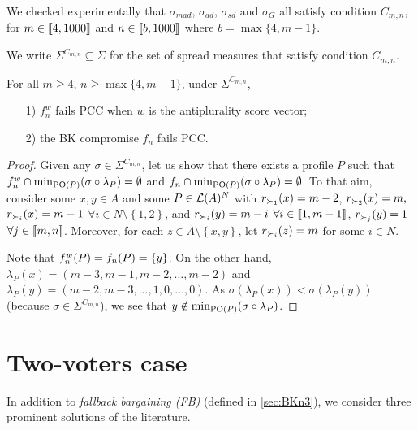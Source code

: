 \begin{remark}
	\label{prop:spreadMeas}
	We checked experimentally that $\sigma_{mad}$, $\sigma_{ad}$, $\sigma_{sd}$ and $\sigma_{G}$ all satisfy condition $C_{m,n}$, for $m \in \llbracket4,1000\rrbracket$ and $n \in \llbracket b, 1000\rrbracket$ where $b = \max\{4,m-1\}$.
\end{remark}


We write $\Sigma^{C_{m,n}} \subseteq \Sigma$ for the set of spread measures that satisfy condition $C_{m,n}$. 
\begin{theorem} 
	\label{th:3votRestriction}
	For all $m\geq 4$, $n\geq \max\{4,m-1\}$, under $\Sigma^{C_{m,n}}$,
	\begin{itemize}
		\item [1)] $f_n^{w}$ fails PCC when $w$ is the antiplurality score vector;
		\item [2)] the \acs{BK} compromise  $f_n$ fails PCC.
	\end{itemize}
\end{theorem}
\begin{proof}
	Given any $\sigma \in \Sigma^{C_{m,n}}$, let us show that there exists a profile $P$ such that $f_n^{w} \cap \mustar = \emptyset$ and $f_n \cap \mustar = \emptyset$. To that aim, consider some $x,y\in A$ and some $P\in \mathcal{L}(A)^{N}$ with $r_{\prefi[1]}(x)=m-2$, $r_{\prefi[2]}(x)=m,$ $r_{\prefi}(x)=m-1$ $\forall i\in N \setminus \left\{ 1, 2\right\}$, and $r_{\prefi}(y)=m-i$ $\forall i\in \llbracket1,m-1\rrbracket$, $r_{\prefi[j]}(y)=1$ $\forall j\in \llbracket m,n\rrbracket$. Moreover, for each $z\in A \setminus \left\{ x,y\right\} $, let $r_{\prefi[i]}(z)=m$ for some $i\in N$. 
	
	Note that $f_n^{w}(P) = f_{n}(P) = \{y\}$. On the other hand, $\lambda_{P}(x)=(m-3, m-1,m-2,\dots,m-2)$ and $\lambda_{P}(y)=(m-2, m-3,\dots,1,0, \dots, 0)$. As $\sigma(\lambda_{P}(x)) < \sigma(\lambda_{P}(y))$ (because $\sigma \in \Sigma^{C_{m,n}}$), we see that $y\notin \mustar$.
\end{proof}

\section{Two-voters case}
\label{sec:2voters}
In addition to \emph{fallback bargaining (FB)} \citep{Brams2001} (defined in \cref{sec:BKn3}), we consider three prominent solutions of the literature.

